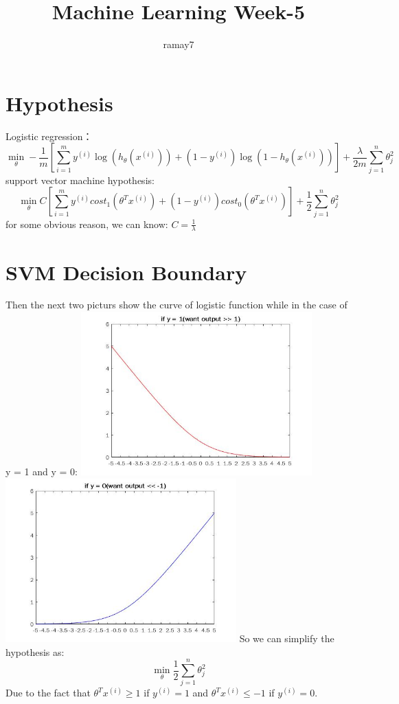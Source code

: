 \documentclass[11pt]{article}
\begin{document}
	\title{Machine Learning Week-5}
	\author{ramay7}
	
	\maketitle %
	\tableofcontents %
	
	\section{Hypothesis}
		Logistic regression：
		$$\min \limits_{\theta} -\frac{1}{m}\left[ \sum_{i=1}^{m} y^{(i)} \log(h_{\theta}(x^{(i)})) + (1-y^{(i)})\log (1-h_{\theta}(x^{(i)})) \right] + \frac{\lambda}{2m}\sum_{j=1}^{n} \theta_{j}^2$$
		support vector machine hypothesis:
		$$\min \limits_{\theta} C \left[ \sum_{i=1}^{m} y^{(i)} cost_{1}(\theta ^ T x^{(i)}) + (1-y^{(i)})cost_{0}(\theta ^ T x^{(i)}) \right] + \frac{1}{2}\sum_{j=1}^{n} \theta_{j}^2$$
		for some obvious reason, we can know: $C = \frac{1}{\lambda}$
	\section{SVM Decision Boundary}
		Then the next two picturs show the curve of logistic function while in the case of y = 1 and y = 0:
		\includegraphics[width=3.5in]{if_y_=_1}
		\includegraphics[width=3.5in]{if_y_=_0}
		So we can simplify the hypothesis as:
		$$
		\min \limits_{\theta}\frac{1}{2} \sum_{j=1}^{n}\theta_{j}^2
		$$
		Due to the fact that $\theta ^ T x^{(i)} \geq 1$ if $y^{(i)} = 1$ and $\theta ^ T x^{(i)} \leq -1$ if $y^{(i)} = 0$.
\end{document}

